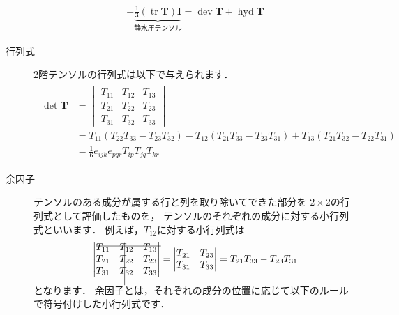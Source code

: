 \begin{description}
\begin{align}
             + \underbrace{\frac{1}{3}(\mathop{\mathrm{tr}}\bm{T})\bm{I}}_{\text{静水圧テンソル}}
             = \mathop{\mathrm{dev}}\bm{T} + \mathop{\mathrm{hyd}}\bm{T}
            \end{align}
 \item[行列式] 2階テンソルの行列式は以下で与えられます．
            \begin{align}
             \label{eq:1.35}
             \begin{split}
              \det\bm{T} &= \begin{vmatrix}
                             T_{11} & T_{12} & T_{13} \\
                             T_{21} & T_{22} & T_{23} \\
                             T_{31} & T_{32} & T_{33}
                            \end{vmatrix} \\
              &= T_{11}(T_{22}T_{33} - T_{23}T_{32})
              - T_{12}(T_{21}T_{33} - T_{23}T_{31})
              + T_{13}(T_{21}T_{32} - T_{22}T_{31}) \\
              &= \frac{1}{6}e_{ijk}e_{pqr}T_{ip}T_{jq}T_{kr}
             \end{split}
            \end{align}
 \item[余因子] テンソルのある成分が属する行と列を取り除いてできた部分を
            $2 \times 2$の行列式として評価したものを，
            テンソルのそれぞれの成分に対する小行列式といいます．
            例えば，$T_{12}$に対する小行列式は
            \begin{align}
             \label{eq:1.36}
             \begin{vmatrix}
              \rlap{\rule[4pt]{67pt}{.4pt}}T_{11} &
              \rlap{\hskip5pt\smash{\rule[-36pt]{.4pt}{44pt}}}T_{12} & T_{13} \\
              T_{21} & T_{22} & T_{23} \\
              T_{31} & T_{32} & T_{33}
             \end{vmatrix}
             = \begin{vmatrix}
                T_{21} & T_{23} \\
                T_{31} & T_{33}
               \end{vmatrix}
             = T_{21}T_{33} - T_{23}T_{31}
            \end{align}
            となります．
            余因子とは，それぞれの成分の位置に応じて以下のルールで符号付けした小行列式です．

\end{description}
